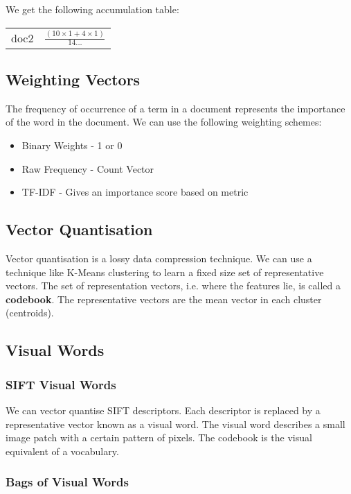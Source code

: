 \noindent We get the following accumulation table:

\begin{table}[!h]
\centering
\begin{tabular}{lr}
doc2 & $\frac{(10\times 1 + 4\times 1)}{14...}$
\end{tabular}
\end{table}

\subsection{Weighting Vectors}

The frequency of occurrence of a term in a document represents the importance of the word in the document. We can use the following weighting schemes:

\begin{itemize}
    \itemsep0em
    \item Binary Weights - 1 or 0
    \item Raw Frequency - Count Vector
    \item TF-IDF - Gives an importance score based on metric
\end{itemize}

\subsection{Vector Quantisation}
Vector quantisation is a lossy data compression technique. We can use a technique like K-Means clustering to learn a fixed size set of representative vectors. The set of representation vectors, i.e. where the features lie, is called a \textbf{codebook}. The representative vectors are the mean vector in each cluster (centroids).

\subsection{Visual Words}

\subsubsection{SIFT Visual Words}

We can vector quantise SIFT descriptors. Each descriptor is replaced by a representative vector known as a visual word. The visual word describes a small image patch with a certain pattern of pixels. The codebook is the visual equivalent of a vocabulary.

\subsubsection{Bags of Visual Words}

